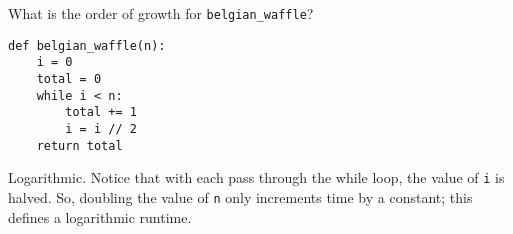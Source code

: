 \begin{blocksection}
\question What is the order of growth for \lstinline{belgian_waffle}? \\
\begin{lstlisting}
def belgian_waffle(n):
    i = 0
    total = 0
    while i < n:
        total += 1
        i = i // 2
    return total
\end{lstlisting}

\begin{solution}
Logarithmic. Notice that with each pass through the while loop, the value of \lstinline{i} is halved. So, doubling the value of \lstinline{n} only increments time by a constant; this defines a logarithmic runtime.
\end{solution}
\end{blocksection}

